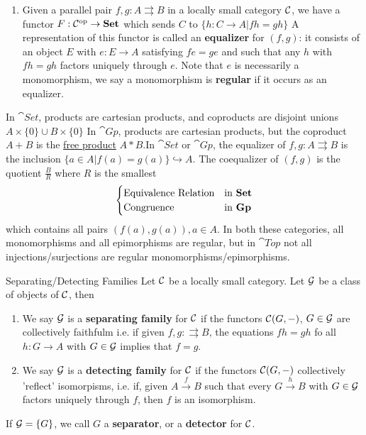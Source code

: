 \documentclass{article}
\begin{document}
\begin{ex}
\begin{enumerate}
        \item[(g)] Given a parallel pair $f,g: A \rightrightarrows B$ in a locally small category $\mathcal{C}$, we have a functor $F: \mathcal{C}^{\text{op}} \to \textbf{Set}$ which sends $C$ to $\{h: C \to A | fh = gh\}$ A representation of this functor is called an \textbf{equalizer} for $(f,g)$: it consists of an object $E$ with $e : E \to A$ satisfying $fe = ge$ and such that any $h$ with $fh=gh$ factors uniquely through $e$. Note that $e$ is necessarily a monomorphism, we say a monomorphism is \textbf{regular} if it occurs as an equalizer.
    \end{enumerate}
    In $\cat{Set}$, products are cartesian products, and coproducts are disjoint unions $A \times \{0\} \cup B \times \{ 0 \}$ \gap In $\cat{Gp}$, products are cartesian products, but the coproduct $A+B$ is the \underline{free product} $A * B$.\gap In $\cat{Set}$ or $\cat{Gp}$, the equalizer of $f,g : A \rightrightarrows B$ is the inclusion $\{a \in A | f(a)=g(a)\} \hookrightarrow A$. \gap The coequalizer of $(f,g)$ is the quotient $\frac{B}{R}$ where $R$ is the smallest \[\begin{cases} \text{Equivalence Relation} & \text{in \textbf{Set}}\\
        \text{Congruence} & \text{in \textbf{Gp}} \end{cases}\]
    which contains all pairs $(f(a),g(a)), a \in A$. \gap In both these categories, all monomorphisms and all epimorphisms are regular, but in $\cat{Top}$ not all injections/surjections are regular monomorphisms/epimorphisms.
\end{ex}
\begin{fancydefine}{Separating/Detecting Families}
    Let $\mathcal{C}$ be a locally small category. Let $\mathcal{G}$ be a class of objects of $\mathcal{C}$, then \begin{enumerate}
        \item[(a)] We say $\mathcal{G}$ is a \textbf{separating family} for $\mathcal{C}$ if the functors $\mathcal{C}(G,-)$, $G \in \mathcal{G}$ are collectively faithfulm i.e. if given $f,g : \rightrightarrows B$, the equations $fh=gh$ fo all $h:G \to A$ with $G \in \mathcal{G}$ implies that $f=g$.
        \item[(b)] We say $\mathcal{G}$ is a \textbf{detecting family} for $\mathcal{C}$ if the functors $\mathcal{C}(G,-)$ collectively 'reflect' isomorpisms, i.e. if, given $A \xrightarrow f B$ such that every $G \xrightarrow h B$ with $G \in \mathcal{G}$ factors uniquely through $f$, then $f$ is an isomorphism.
    \end{enumerate}
    If $\mathcal{G} = \{G \}$, we call $G$ a \textbf{separator}, or a \textbf{detector} for $\mathcal{C}$.
\end{fancydefine}
\end{document}
